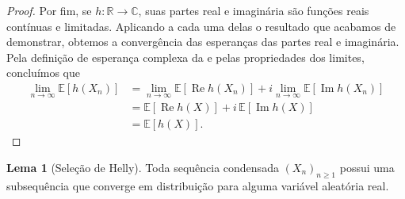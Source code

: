 \documentclass[12pt,portuguese]{article}
\theoremstyle{definition}
\newtheorem{lemma}[lemma]{Lema}
\theoremstyle{plainexercise}
\theoremstyle{starredexercise}
\theoremstyle{definition}
\begin{document}
\begin{proof}
Por fim, se $h:\mathbb{R}\to\mathbb{C}$, suas partes real e imaginária são
funções reais contínuas e limitadas. Aplicando a cada uma delas o resultado
que acabamos de demonstrar, obtemos a convergência das esperanças das partes
real e imaginária. Pela definição de esperança complexa da
 e pelas propriedades dos limites, concluímos que
\begin{align*}
\lim_{n\to\infty}\mathbb{E}[h(X_n)]
&=\lim_{n\to\infty}\mathbb{E}[\operatorname{Re}h(X_n)]
+i\lim_{n\to\infty}\mathbb{E}[\operatorname{Im}h(X_n)]\\[0.3cm]
&=
\mathbb{E}[\operatorname{Re}h(X)]
+i\,\mathbb{E}[\operatorname{Im}h(X)]\\[0.3cm]
&=\mathbb{E}[h(X)].
\end{align*}
\end{proof}

\begin{lemma}[Seleção de Helly]\label{lem:selecao-condensada}
Toda sequência condensada $(X_n)_{n\geqslant1}$ possui uma subsequência que converge em
distribuição para alguma variável aleatória real.
\end{lemma}
\end{document}
